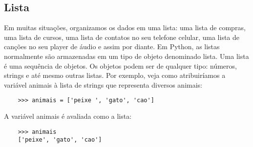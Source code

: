 			\subsection{Lista}
			Em muitas situações, organizamos os dados em uma lista: uma lista de compras, uma lista de
			cursos, uma lista de contatos no seu telefone celular, uma lista de canções no seu player de áudio
			e assim por diante. Em Python, as listas normalmente são armazenadas em um tipo de objeto
			denominado lista. Uma lista é uma sequência de objetos. Os objetos podem ser de qualquer tipo:
			números, strings e até mesmo outras listas. Por exemplo, veja como atribuiríamos a
			variável animais à lista de strings que representa diversos animais:
			
			\begin{lstlisting}
	>>> animais = ['peixe ', 'gato', 'cao']
			\end{lstlisting}
		
			A variável animais é avaliada como a lista:
			
			\begin{lstlisting}
	>>> animais
	['peixe', 'gato', 'cao']
			\end{lstlisting}
			
